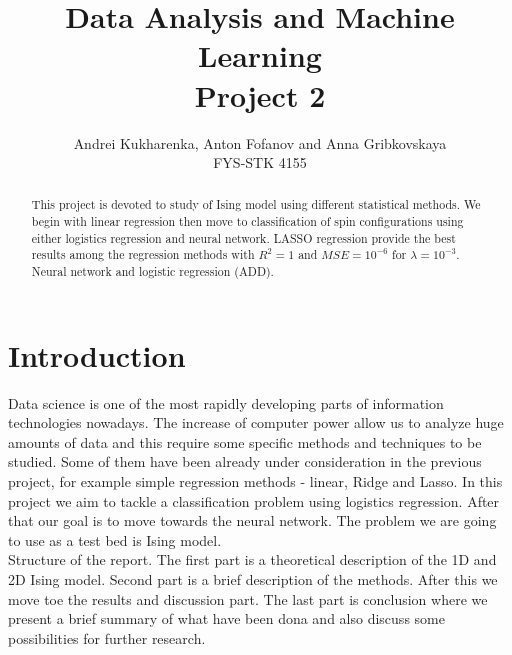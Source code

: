 \documentclass[10pt]{article}
\begin{document}
\setlength\parindent{1pt}
\title{Data Analysis and Machine Learning \\
	Project 2\\ }
\author{Andrei Kukharenka, Anton Fofanov and Anna Gribkovskaya \\  
	FYS-STK 4155 
}

\maketitle
\begin{abstract}
	This project is devoted to study of Ising model using different statistical methods. We begin with linear regression then move to classification of spin configurations using either logistics regression and neural network. LASSO regression provide the best results among the regression methods with $R^2=1$ and $MSE=10^{-6}$ for $\lambda=10^{-3}$.\\
	Neural network and logistic regression (ADD).
\end{abstract}

\section{Introduction}

Data science is one of the most rapidly developing parts of information technologies nowadays. The increase of computer power allow us to analyze huge amounts of data and this require some specific methods and techniques to be studied. Some of them have been already under consideration in the previous project, for example simple regression methods - linear, Ridge and Lasso. In this project we aim to tackle a classification problem using logistics regression. After that our goal is to move towards the neural network. The problem we are going to use as a test bed is Ising model. \\

Structure of the report. The first part is a theoretical description of the 1D and 2D Ising model. Second part is a brief description of the methods. After this we move toe the results and discussion part. The last part is conclusion where we present a brief summary of what have been dona and also discuss some possibilities for further research.
\end{document}
